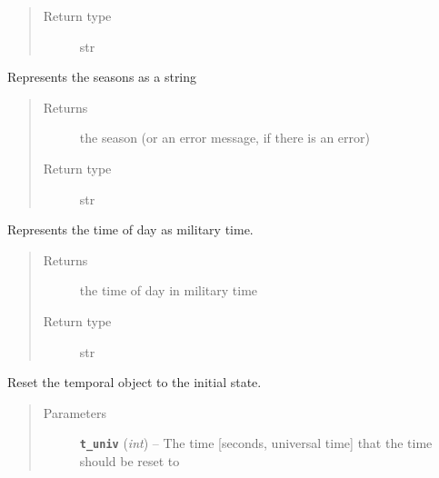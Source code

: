 \documentclass[letterpaper,10pt,english]{sphinxmanual}
\begin{document}
\begin{fulllineitems}
\begin{fulllineitems}
\begin{quote}
\begin{description}
\item[{Return type}] \leavevmode
str

\end{description}\end{quote}

\end{fulllineitems}


\begin{fulllineitems}
\label{temporal:temporal.Temporal.print_season}
Represents the seasons as a string
\begin{quote}\begin{description}
\item[{Returns}] \leavevmode
the season (or an error message, if there is an error)

\item[{Return type}] \leavevmode
str

\end{description}\end{quote}

\end{fulllineitems}


\begin{fulllineitems}
\label{temporal:temporal.Temporal.print_time_of_day_to_military}
Represents the time of day as military time.
\begin{quote}\begin{description}
\item[{Returns}] \leavevmode
the time of day in military time

\item[{Return type}] \leavevmode
str

\end{description}\end{quote}

\end{fulllineitems}


\begin{fulllineitems}
\label{temporal:temporal.Temporal.reset}
Reset the temporal object to the initial state.
\begin{quote}\begin{description}
\item[{Parameters}] \leavevmode
\textbf{\texttt{t\_univ}} (\emph{int}) -- The time {[}seconds, universal time{]} that the time should be reset to


\end{description}
\end{quote}
\end{fulllineitems}
\end{fulllineitems}
\end{document}
